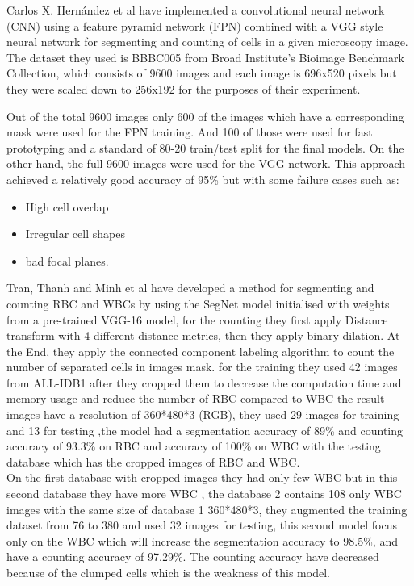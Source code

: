 Carlos X. Hern{\'{a}}ndez et al \textsuperscript{\cite{DBLP:journals/corr/abs-1802-10548}} have implemented a convolutional neural network (CNN) using a feature pyramid network (FPN) combined with a VGG style neural network for segmenting and counting of cells in a given microscopy image.
The dataset they used is BBBC005 \textsuperscript{\cite{ljosa2012annotated}} from Broad Institute's Bioimage Benchmark Collection, which consists of 9600 images and each image is 696x520 pixels but they were scaled down to 256x192 for the purposes of their experiment.

\newpage

Out of the total 9600 images only 600 of the images which have a corresponding mask were used for the FPN training. And 100 of those were used for fast prototyping and a standard of 80-20 train/test split for the final models.
On the other hand, the full 9600 images were used for the VGG network.
This approach achieved a relatively good accuracy of 95\% but with some failure cases such as:

\begin{itemize}
  \item High cell overlap
  \item Irregular cell shapes
  \item bad focal planes.
\end{itemize}

Tran, Thanh and Minh et al \textsuperscript{\cite{tran2019blood}} have developed a method for segmenting and counting RBC and WBCs by using the SegNet model initialised with weights from a pre-trained VGG-16 model, for the counting they first apply Distance transform with 4 different distance metrics, then they apply binary dilation. At the End, they apply the connected component labeling algorithm to count the number of separated cells in images mask. for the training they used 42 images from ALL-IDB1 \textsuperscript{\cite{labati2011all}} after they cropped them to decrease the computation time and
memory usage and reduce the number of RBC compared to WBC the result images have a resolution of 360*480*3 (RGB), they used 29 images for training and 13 for testing ,the model had a segmentation accuracy of 89\% and counting accuracy of 93.3\% on RBC and accuracy of 100\% on WBC with the testing database which has the cropped images of RBC and WBC.\\
On the first database with cropped images they had only few WBC but in this second database they have more WBC , the database 2 contains 108 only WBC images with the same size of database 1 360*480*3, they augmented the training dataset from 76 to 380 and used 32 images for testing, this second model focus only on the WBC which will increase the segmentation accuracy to 98.5\%, and have a counting accuracy of 97.29\%. The counting accuracy have decreased because of the clumped cells which is the weakness of this model.\\


